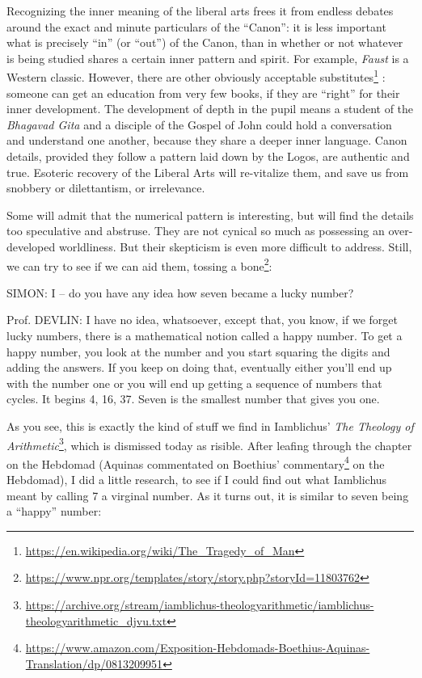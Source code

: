 Recognizing the inner meaning of the liberal arts frees it from endless debates around the exact and minute particulars of the ``Canon'': it is less important what is precisely ``in'' (or ``out'') of the Canon, than in whether or not whatever is being studied shares a certain inner pattern and spirit. For example, \emph{Faust} is a Western classic. However, there are other obviously acceptable substitutes\footnote{\url{https://en.wikipedia.org/wiki/The_Tragedy_of_Man}} : someone can get an education from very few books, if they are ``right'' for their inner development. The development of depth in the pupil means a student of the \emph{Bhagavad Gita} and a disciple of the Gospel of John could hold a conversation and understand one another, because they share a deeper inner language. Canon details, provided they follow a pattern laid down by the Logos, are authentic and true. Esoteric recovery of the Liberal Arts will re-vitalize them, and save us from snobbery or dilettantism, or irrelevance.

Some will admit that the numerical pattern is interesting, but will find the details too speculative and abstruse. They are not cynical so much as possessing an over-developed worldliness. But their skepticism is even more difficult to address. Still, we can try to see if we can aid them, tossing a bone\footnote{\url{https://www.npr.org/templates/story/story.php?storyId=11803762}}:

\begin{quotex}
SIMON: I -- do you have any idea how seven became a lucky number?

Prof. DEVLIN: I have no idea, whatsoever, except that, you know, if we forget lucky numbers, there is a mathematical notion called a happy number. To get a happy number, you look at the number and you start squaring the digits and adding the answers. If you keep on doing that, eventually either you'll end up with the number one or you will end up getting a sequence of numbers that cycles. It begins 4, 16, 37. Seven is the smallest number that gives you one.
\end{quotex}


As you see, this is exactly the kind of stuff we find in Iamblichus' \textit{The Theology of Arithmetic}\footnote{\url{https://archive.org/stream/iamblichus-theologyarithmetic/iamblichus-theologyarithmetic_djvu.txt}}, which is dismissed today as risible. After leafing through the chapter on the Hebdomad (Aquinas commentated on Boethius' commentary\footnote{\url{https://www.amazon.com/Exposition-Hebdomads-Boethius-Aquinas-Translation/dp/0813209951}} on the Hebdomad), I did a little research, to see if I could find out what Iamblichus meant by calling 7 a virginal number. As it turns out, it is similar to seven being a ``happy'' number:

